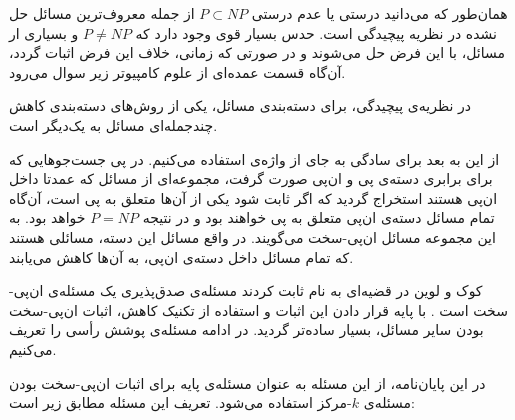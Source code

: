 همان‌طور که می‌دانید درستی یا عدم درستی $P \subset NP$ از جمله معروف‌ترین مسائل حل نشده در نظریه پیچیدگی است. حدس بسیار قوی وجود دارد که $P \neq NP$ و بسیاری ار مسائل، با این فرض حل می‌شوند و در صورتی که زمانی، خلاف این فرض اثبات گردد، آن‌گاه قسمت عمده‌ای از علوم کامپیوتر زیر سوال می‌رود.

در نظریه‌ی پیچیدگی، برای دسته‌بندی مسائل، یکی از روش‌های دسته‌بندی کاهش چند‌جمله‌ای مسائل به یک‌دیگر است. 


از این به بعد برای سادگی به جای  از واژه‌ی  استفاده می‌کنیم. در پی جست‌جوهایی که برای برابری دسته‌ی پی و ان‌پی صورت گرفت، مجموعه‌ای از مسائل که عمدتا داخل ان‌پی هستند استخراج گردید که اگر ثابت شود یکی از آن‌ها متعلق به پی است، آن‌گاه تمام مسائل دسته‌ی ان‌پی متعلق به پی خواهند بود و در نتیجه $P = NP$ خواهد بود. به این مجموعه مسائل ان‌پی-سخت می‌گویند. در واقع مسائل این دسته، مسائلی هستند که تمام مسائل داخل دسته‌ی ان‌پی، به آن‌ها کاهش می‌یابند.

کوک و لوین در قضیه‌ای به نام  ثابت کردند مسئله‌ی صدق‌پذیری یک مسئله‌ی ان‌پی-سخت است . با پایه قرار دادن این اثبات و استفاده از تکنیک کاهش، اثبات ان‌پی-سخت بودن سایر مسائل، بسیار ساده‌تر گردید. در ادامه مسئله‌ی پوشش رأسی را تعریف می‌کنیم.

در این پایان‌نامه، از این مسئله به عنوان مسئله‌ی پایه برای اثبات ان‌پی-سخت بودن مسئله‌ی $k$-مرکز استفاده می‌شود. تعریف این مسئله مطابق زیر است:


